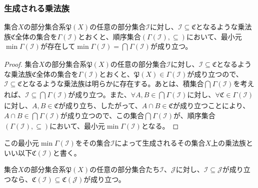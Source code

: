 \documentclass[dvipdfmx]{jsarticle}
\begin{document}
\subsubsection{生成される乗法族}%
\begin{thm}\label{4.5.6.15}
集合$X$の部分集合系$\mathfrak{P}(X)$の任意の部分集合$\mathcal{I}$に対し、$\mathcal{I \subseteq}\mathfrak{C}$となるような乗法族$\mathfrak{C}$全体の集合を$\varGamma\left( \mathcal{I} \right)$とおくと、順序集合$\left( \varGamma\left( \mathcal{I} \right), \subseteq \right)$において、最小元$\min{\varGamma\left( \mathcal{I} \right)}$が存在して$\min{\varGamma\left( \mathcal{I} \right)} = \bigcap_{} {\varGamma\left( \mathcal{I} \right)}$が成り立つ。
\end{thm}
\begin{proof}
集合$X$の部分集合系$\mathfrak{P}(X)$の任意の部分集合$\mathcal{I}$に対し、$\mathcal{I \subseteq}\mathfrak{C}$となるような乗法族$\mathfrak{C}$全体の集合を$\varGamma\left( \mathcal{I} \right)$とおくと、$\mathfrak{P}(X) \in \varGamma\left( \mathcal{I} \right)$が成り立つので、$\mathcal{I \subseteq}\mathfrak{C}$となるような乗法族は明らかに存在する。あとは、積集合$\bigcap_{} {\varGamma\left( \mathcal{I} \right)}$を考えれば、$\mathcal{I \subseteq}\bigcap_{} {\varGamma\left( \mathcal{I} \right)}$が成り立つ。また、$\forall A,B \in \bigcap_{} {\varGamma\left( \mathcal{I} \right)}$に対し、$\mathfrak{\forall C \in}\varGamma\left( \mathcal{I} \right)$に対し、$A,B\in \mathfrak{C}$が成り立ち、したがって、$A \cap B\in \mathfrak{C}$が成り立つことにより、$A \cap B \in \bigcap_{} {\varGamma\left( \mathcal{I} \right)}$が成り立つので、この集合$\bigcap_{} {\varGamma\left( \mathcal{I} \right)}$が、順序集合$\left( \varGamma\left( \mathcal{I} \right), \subseteq \right)$において、最小元$\min{\varGamma\left( \mathcal{I} \right)}$となる。
\end{proof}
\begin{dfn}
この最小元$\min{\varGamma\left( \mathcal{I} \right)}$をその集合$\mathcal{I}$によって生成されるその集合$X$上の乗法族といい以下$\mathfrak{C}\left( \mathcal{I} \right)$と書く。
\end{dfn}
\begin{thm}\label{4.5.6.16}
集合$X$の部分集合系$\mathfrak{P}(X)$の任意の部分集合たち$\mathcal{I}$、$\mathcal{J}$に対し、$\mathcal{I \subseteq J}$が成り立つなら、$\mathfrak{C}\left( \mathcal{I} \right) \subseteq \mathfrak{C}\left( \mathcal{J} \right)$が成り立つ。
\end{thm}
\end{document}
